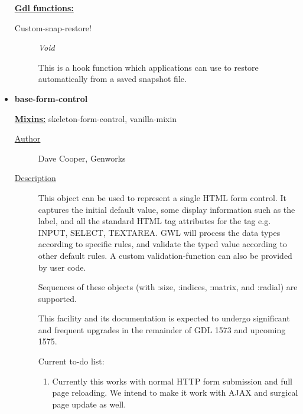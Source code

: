 \documentclass [11pt]{book}
\begin{document}
\begin{itemize}
\textbf{
\underline{Gdl functions:}}

\begin{description}

\item [Custom-snap-restore!]
\emph{Void}

 This is a hook function which applications can use to restore automatically
from a saved snapshot file.




\end{description}







\item {}
\label{prim:base-form-control}
\textbf{base-form-control}


\textbf{
\underline{Mixins:}} skeleton-form-control, vanilla-mixin





\begin{description}

\item [
\underline{Author}]


Dave Cooper, Genworks



\item [
\underline{Description}]


This object can be used to represent a single HTML form control. It captures the 
initial default value, some display information such as the label, and all the standard HTML tag attributes
for the tag e.g. INPUT, SELECT, TEXTAREA. GWL will process the data types according to specific rules,
and validate the typed value according to other default rules. A custom validation-function can also 
be provided by user code. 

Sequences of these objects (with :size, :indices, :matrix, and :radial) are supported.

This facility and its documentation is expected to undergo significant and frequent upgrades in the remainder of GDL 1573 and upcoming 1575.

Current to-do list:



\begin{enumerate}

\item 
Currently this works with normal HTTP form submission and full page reloading. 
We intend to make it work with AJAX and surgical page update as well.




\end{enumerate}
\end{description}
\end{itemize}
\end{document}
